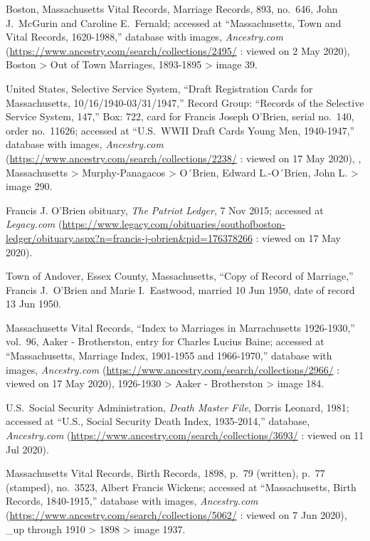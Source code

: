 \begin{thebibliography}{999}
Boston, Massachusetts Vital Records, Marriage Records, 893, no.\ 646, John J.\ McGurin and Caroline E.\ Fernald; accessed at ``Massachusetts, Town and Vital Records, 1620-1988,'' database with images, \textit{Ancestry.com} (\url{https://www.ancestry.com/search/collections/2495/} : viewed on 2 May 2020), Boston > Out of Town Marriages, 1893-1895 > image 39.

United States, Selective Service System, ``Draft Registration Cards for Massachusetts, 10/16/1940-03/31/1947,'' Record Group: ``Records of the Selective Service System, 147,'' Box: 722, card for Francis Joseph O'Brien, serial no.\ 140, order no.\ 11626; accessed at ``U.S.\ WWII Draft Cards Young Men, 1940-1947,'' database with images, \textit{Ancestry.com} (\url{https://www.ancestry.com/search/collections/2238/} : viewed on 17 May 2020), , Massachusetts > Murphy-Panagacos > O´Brien, Edward L.-O´Brien, John L. > image 290.

Francis J. O'Brien obituary, \textit{The Patriot Ledger}, 7 Nov 2015; accessed at \textit{Legacy.com} (\url{https://www.legacy.com/obituaries/southofboston-ledger/obituary.aspx?n=francis-j-obrien\&pid=176378266} : viewed on 17 May 2020).

Town of Andover, Essex County, Massachusetts, ``Copy of Record of Marriage,'' Francis J.\ O'Brien and Marie I.\ Eastwood, married 10 Jun 1950, date of record 13 Jun 1950.

Massachusetts Vital Records, ``Index to Marriages in Marrachusetts 1926-1930,'' vol.\ 96, Aaker - Brotherston, entry for Charles Lucius Baine; accessed at ``Massachusetts, Marriage Index, 1901-1955 and 1966-1970,'' database with images, \textit{Ancestry.com} (\url{https://www.ancestry.com/search/collections/2966/} : viewed on 17 May 2020), 1926-1930 > Aaker - Brotherston > image 184.

U.S.\ Social Security Administration, \textit{Death Master File}, Dorris Leonard, 1981; accessed at ``U.S., Social Security Death Index, 1935-2014,'' database, \textit{Ancestry.com} (\url{https://www.ancestry.com/search/collections/3693/} : viewed on 11 Jul 2020).

Massachusetts Vital Records, Birth Records, 1898, p.\ 79 (written), p.\ 77 (stamped), no.\ 3523, Albert Francis Wickens; accessed at ``Massachusetts, Birth Records, 1840-1915,'' database with images, \textit{Ancestry.com} (\url{https://www.ancestry.com/search/collections/5062/} : viewed on 7 Jun 2020), \_up through 1910 > 1898 > image 1937.


\end{thebibliography}
